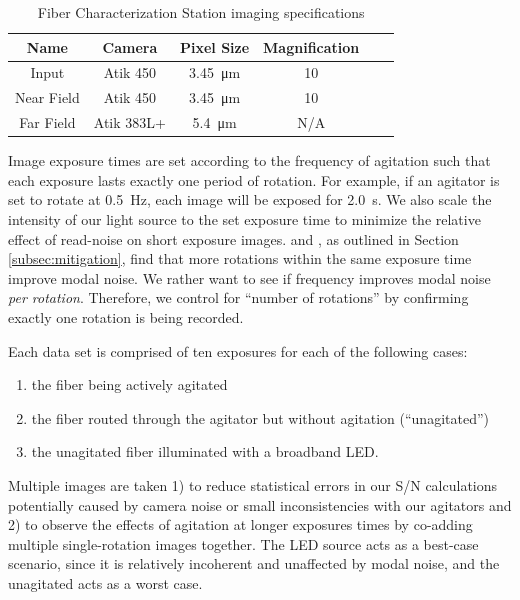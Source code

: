 \documentclass[twocolumn]{emulateapj}
\begin{document}
\begin{table}
\centering
\caption{Fiber Characterization Station imaging specifications}
	\begin{tabular}{cccccc}
	\hline
	Name & Camera & Pixel Size & Magnification \\
	\hline \hline
	Input & Atik 450 & \SI{3.45}{\micro\meter} & 10 \\
	\hline
	Near Field & Atik 450 & \SI{3.45}{\micro\meter} & 10 \\
	\hline
	Far Field & Atik 383L+ & \SI{5.4}{\micro\meter} & N/A \\
	\hline	
	\end{tabular}
\label{table:cameras}
\end{table}

Image exposure times are set according to the frequency of agitation such that each exposure lasts exactly one period of rotation. For example, if an agitator is set to rotate at \SI{0.5}{\hertz}, each image will be exposed for \SI{2.0}{\second}. We also scale the intensity of our light source to the set exposure time to minimize the relative effect of read-noise on short exposure images. \citet{Baudrand2001} and \citet{Lemke2011}, as outlined in Section \ref{subsec:mitigation}, find that more rotations within the same exposure time improve modal noise. We rather want to see if frequency improves modal noise \textit{per rotation}. Therefore, we control for ``number of rotations'' by confirming exactly one rotation is being recorded.

Each data set is comprised of ten exposures for each of the following cases:
\begin{enumerate}
\item the fiber being actively agitated
\item the fiber routed through the agitator but without agitation (``unagitated'')
\item the unagitated fiber illuminated with a broadband LED.
\end{enumerate}
Multiple images are taken 1) to reduce statistical errors in our S/N calculations potentially caused by camera noise or small inconsistencies with our agitators and 2) to observe the effects of agitation at longer exposures times by co-adding multiple single-rotation images together. The LED source acts as a best-case scenario, since it is relatively incoherent and unaffected by modal noise, and the unagitated acts as a worst case.
\end{document}
